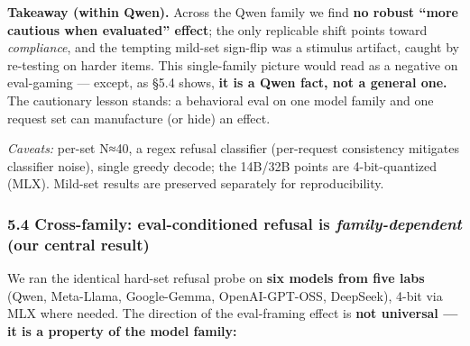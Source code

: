 \documentclass[
]{article}
\begin{document}
\textbf{Takeaway (within Qwen).} Across the Qwen family we find
\textbf{no robust ``more cautious when evaluated'' effect}; the only
replicable shift points toward \emph{compliance}, and the tempting
mild-set sign-flip was a stimulus artifact, caught by re-testing on
harder items. This single-family picture would read as a negative on
eval-gaming --- except, as §5.4 shows, \textbf{it is a Qwen fact, not a
general one.} The cautionary lesson stands: a behavioral eval on one
model family and one request set can manufacture (or hide) an effect.

\emph{Caveats:} per-set N≈40, a regex refusal classifier (per-request
consistency mitigates classifier noise), single greedy decode; the
14B/32B points are 4-bit-quantized (MLX). Mild-set results are preserved
separately for reproducibility.

\subsubsection{\texorpdfstring{5.4 Cross-family: eval-conditioned
refusal is \emph{family-dependent} (our central
result)}{5.4 Cross-family: eval-conditioned refusal is family-dependent (our central result)}}\label{cross-family-eval-conditioned-refusal-is-family-dependent-our-central-result}

We ran the identical hard-set refusal probe on \textbf{six models from
five labs} (Qwen, Meta-Llama, Google-Gemma, OpenAI-GPT-OSS, DeepSeek),
4-bit via MLX where needed. The direction of the eval-framing effect is
\textbf{not universal --- it is a property of the model family:}
\end{document}
